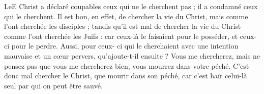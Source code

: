 LeE Christ a déclaré coupables ceux qui ne le cherchent pas ; il a condamné ceux qui le cherchent. Il est bon, en effet, de chercher la vie du Christ, mais comme l’ont cherchée les disciples ; tandis qu’il est mal de chercher la vie du Christ comme l’ont cherchée les Juifs : car ceux-là le faisaient pour le posséder, et ceux-ci pour le perdre. Aussi, pour ceux- ci qui le cherchaient avec une intention mauvaise et un cœur pervers, qu’ajoute-t-il ensuite ? Vous me chercherez, mais ne pensez pas que vous me chercherez bien, vous mourrez dans votre péché. C’est donc mal chercher le Christ, que mourir dans son péché, car c’est haïr celui-là seul par qui on peut être sauvé.
